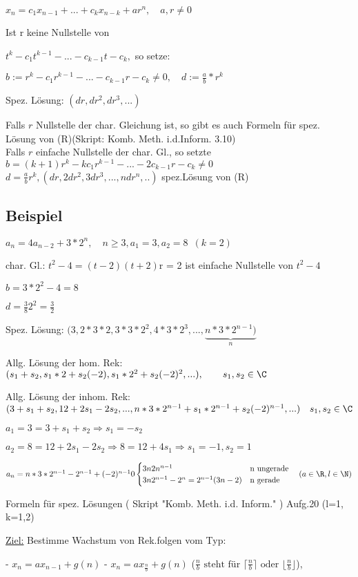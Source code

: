 $x_n = c_1x_{n-1}+...+c_kx_{n-k}+ar^n, \quad a,r\neq 0 $

Ist r keine Nullstelle von

$t^k-c_1t^{k-1}-...-c_{k-1}t-c_k,$ so setze:

$b:= r^k-c_1r^{k-1}-...-c_{k-1}r-c_k \neq 0,\quad d:=\frac{a}{b}*r^k$

Spez. Lösung: $(dr,dr^2,dr^3,...)$

Falls $r$ Nullstelle der char. Gleichung ist, so gibt es auch Formeln für spez. Lösung von (R)(Skript: Komb. Meth. i.d.Inform. 3.10)\\

Falls $r$ einfache Nullstelle der char. Gl., so setzte $b=(k+1)r^k-kc_1r^{k-1}-...-2c_{k-1}r-c_k \neq 0$
$d=\frac{a}{b} r^k, (dr,2dr^2,3dr^3,...,ndr^n,..)$ spez.Lösung von (R)

\subsection{Beispiel}
$a_n = 4a_{n-2}+3*2^n,\quad n\geq 3, a_1 =3, a_2 = 8 \enspace (k=2)$

char. Gl.: $ t^2-4=(t-2)(t+2)$\qquad r = 2 ist einfache Nullstelle von $t^2-4$ 

$b=3*2^2-4=8$

$d=\frac{3}{8}2^2 = \frac{3}{2}$

Spez. Lösung: $(3,2*3*2,3*3*2^2,4*3*2^3,...,\underbrace{n*3*2^{n-1})}_n$

Allg. Lösung der hom. Rek: $(s_1+s_2,s_1*2+s_2(-2),s_1*2^2+s_2(-2)^2,...),\qquad s_1,s_2 \in \C$

Allg. Lösung der inhom. Rek: $(3+s_1+s_2,12+2s_1-2s_2,...,n*3*2^{n-1}+s_1*2^{n-1}+s_2(-2)^{n-1},...) \quad s_1,s_2 \in \C$

$a_1 = 3 = 3+s_1 +s_2 \Rightarrow s_1 = -s_2$

$a_2 = 8 = 12+2s_1-2s_2 \Rightarrow 8=12+4s_1 \Rightarrow s_1 = -1, s_2=1$

$a_n = n*3*2^{n-1}-2^{n-1}+(-2)^{n-1} 0 \begin{cases}
3n2n^{n-1} & \text{n ungerade}\\
3n2^{n-1}-2^n = 2^{n-1}(3n-2) & \text{n gerade}
\end{cases} \quad (a \in \R, l \in \N)$ 

Formeln für spez. Lösungen ( Skript "Komb. Meth. i.d. Inform." ) Aufg.20 (l=1, k=1,2)

\underline{Ziel:} Bestimme Wachstum von Rek.folgen vom Typ:

- $x_n = ax_{n-1}+g(n)$
- $x_n = ax_{\frac{n}{b}}+g(n)$ ($\frac{n}{b} \text{ steht für } \lceil \frac{n}{b}\rceil \text{ oder } \lfloor \frac{n}{b} \rfloor$),

